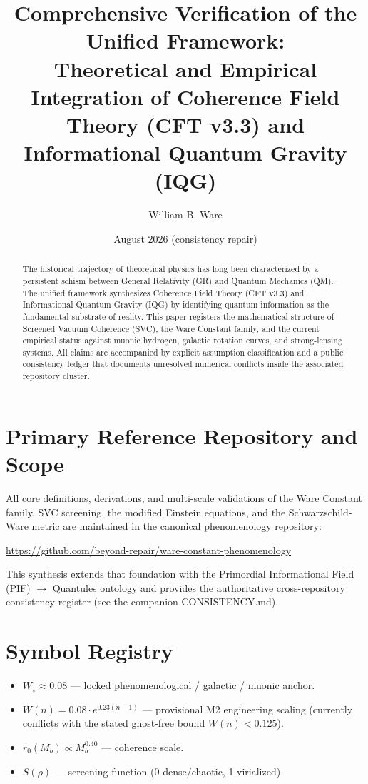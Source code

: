 \documentclass[11pt]{article}
\title{Comprehensive Verification of the Unified Framework:\\Theoretical and Empirical Integration of Coherence Field Theory (CFT v3.3) and Informational Quantum Gravity (IQG)}
\author{William B. Ware}
\date{August 2026 (consistency repair)}
\begin{document}
\maketitle

\begin{abstract}
The historical trajectory of theoretical physics has long been characterized by a persistent schism between General Relativity (GR) and Quantum Mechanics (QM). The unified framework synthesizes Coherence Field Theory (CFT v3.3) and Informational Quantum Gravity (IQG) by identifying quantum information as the fundamental substrate of reality. This paper registers the mathematical structure of Screened Vacuum Coherence (SVC), the Ware Constant family, and the current empirical status against muonic hydrogen, galactic rotation curves, and strong-lensing systems. All claims are accompanied by explicit assumption classification and a public consistency ledger that documents unresolved numerical conflicts inside the associated repository cluster.
\end{abstract}

\section{Primary Reference Repository and Scope}
All core definitions, derivations, and multi-scale validations of the Ware Constant family, SVC screening, the modified Einstein equations, and the Schwarzschild-Ware metric are maintained in the canonical phenomenology repository:

\url{https://github.com/beyond-repair/ware-constant-phenomenology}

This synthesis extends that foundation with the Primordial Informational Field (PIF) $\to$ Quantules ontology and provides the authoritative cross-repository consistency register (see the companion CONSISTENCY.md).

\section{Symbol Registry}
\begin{itemize}
    \item $W_\star \approx 0.08$ --- locked phenomenological / galactic / muonic anchor.
    \item $W(n) = 0.08 \cdot e^{0.23(n-1)}$ --- provisional M2 engineering scaling (currently conflicts with the stated ghost-free bound $W(n)<0.125$).
    \item $r_0(M_b)\propto M_b^{0.40}$ --- coherence scale.
    \item $S(\rho)$ --- screening function (0 dense/chaotic, 1 virialized).
\end{itemize}
\end{document}
